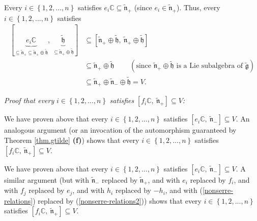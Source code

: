 \documentclass[etingof-lie.tex]{subfiles}
\begin{document}
Every $i\in\left\{  1,2,...,n\right\}  $ satisfies $e_{i}\mathbb{C}%
\subseteq\widetilde{\mathfrak{n}}_{+}$ (since $e_{i}\in\widetilde{\mathfrak{n}%
}_{+}$). Thus, every $i\in\left\{  1,2,...,n\right\}  $ satisfies%
\begin{align*}
\left[  \underbrace{e_{i}\mathbb{C}}_{\subseteq\widetilde{\mathfrak{n}}%
_{+}\subseteq\widetilde{\mathfrak{n}}_{+}\oplus\widetilde{\mathfrak{h}}%
},\ \underbrace{\widetilde{\mathfrak{h}}}_{\subseteq\widetilde{\mathfrak{n}%
}_{+}\oplus\widetilde{\mathfrak{h}}}\right]   &  \subseteq\left[
\widetilde{\mathfrak{n}}_{+}\oplus\widetilde{\mathfrak{h}}%
,\ \widetilde{\mathfrak{n}}_{+}\oplus\widetilde{\mathfrak{h}}\right] \\
&  \subseteq\widetilde{\mathfrak{n}}_{+}\oplus\widetilde{\mathfrak{h}%
}\ \ \ \ \ \ \ \ \ \ \left(  \text{since }\widetilde{\mathfrak{n}}_{+}%
\oplus\widetilde{\mathfrak{h}}\text{ is a Lie subalgebra of }%
\widetilde{\mathfrak{g}}\right) \\
&  \subseteq\widetilde{\mathfrak{n}}_{+}\oplus\widetilde{\mathfrak{n}}%
_{-}\oplus\widetilde{\mathfrak{h}}=V.
\end{align*}


\textit{Proof that every }$i\in\left\{  1,2,...,n\right\}  $\textit{ satisfies
}$\left[  f_{i}\mathbb{C},\ \widetilde{\mathfrak{n}}_{+}\right]  \subseteq
V$\textit{:}

\begin{vershort}
We have proven above that every $i\in\left\{  1,2,...,n\right\}  $ satisfies
$\left[  e_{i}\mathbb{C},\ \widetilde{\mathfrak{n}}_{-}\right]  \subseteq V$.
An analogous argument (or an invocation of the automorphism guaranteed by
Theorem \ref{thm.gtilde} \textbf{(f)}) shows that every $i\in\left\{
1,2,...,n\right\}  $ satisfies $\left[  f_{i}\mathbb{C}%
,\ \widetilde{\mathfrak{n}}_{+}\right]  \subseteq V$.
\end{vershort}

\begin{verlong}
We have proven above that every $i\in\left\{  1,2,...,n\right\}  $ satisfies
$\left[  e_{i}\mathbb{C},\ \widetilde{\mathfrak{n}}_{-}\right]  \subseteq V$.
A similar argument (but with $\widetilde{\mathfrak{n}}_{-}$ replaced by
$\widetilde{\mathfrak{n}}_{+}$, and with $e_{i}$ replaced by $f_{i}$, and with
$f_{j}$ replaced by $e_{j}$, and with $h_{i}$ replaced by $-h_{i}$, and with
(\ref{nonserre-relations}) replaced by (\ref{nonserre-relations2})) shows that
every $i\in\left\{  1,2,...,n\right\}  $ satisfies $\left[  f_{i}%
\mathbb{C},\ \widetilde{\mathfrak{n}}_{+}\right]  \subseteq V$.
\end{verlong}
\end{document}
